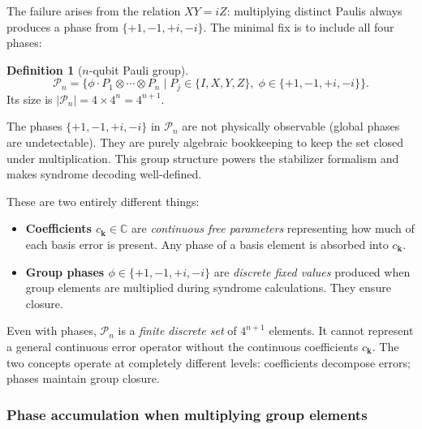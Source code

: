 \documentclass[11pt, a4paper]{article}
\theoremstyle{definition}
\newtheorem{definition}{Definition}[section]
\theoremstyle{plain}
\theoremstyle{remark}
\begin{document}
The failure arises from the relation $XY = iZ$: multiplying distinct Paulis
always produces a phase from $\{+1,-1,+i,-i\}$.  The minimal fix is to
include all four phases:

\begin{definition}[$n$-qubit Pauli group]
\[
  \mathcal{P}_n = \bigl\{ \phi \cdot P_1 \otimes \cdots \otimes P_n
    \;\big|\; P_j \in \{I,X,Y,Z\},\;
    \phi \in \{+1,-1,+i,-i\} \bigr\}.
\]
Its size is $|\mathcal{P}_n| = 4 \times 4^n = 4^{n+1}$.
\end{definition}

\begin{keypoint}
The phases $\{+1,-1,+i,-i\}$ in $\mathcal{P}_n$ are not physically
observable (global phases are undetectable).  They are purely algebraic
bookkeeping to keep the set closed under multiplication.  This group
structure powers the stabilizer formalism and makes syndrome decoding
well-defined.
\end{keypoint}

\begin{caution}
These are two entirely different things:
\begin{itemize}
  \item \textbf{Coefficients $c_\mathbf{k} \in \mathbb{C}$} are
        \emph{continuous free parameters} representing how much of each
        basis error is present.  Any phase of a basis element is absorbed
        into $c_\mathbf{k}$.
  \item \textbf{Group phases $\phi \in \{+1,-1,+i,-i\}$} are
        \emph{discrete fixed values} produced when group elements are
        multiplied during syndrome calculations.  They ensure closure.
\end{itemize}
Even with phases, $\mathcal{P}_n$ is a \emph{finite discrete set} of
$4^{n+1}$ elements.  It cannot represent a general continuous error
operator without the continuous coefficients $c_\mathbf{k}$.  The two
concepts operate at completely different levels: coefficients decompose
errors; phases maintain group closure.
\end{caution}

\subsubsection{Phase accumulation when multiplying group elements}
\end{document}
